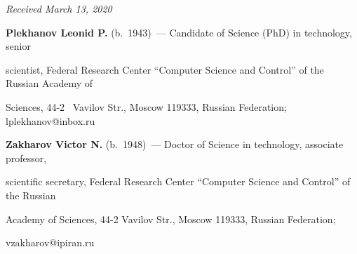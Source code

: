 \vspace*{-6pt}





\hfill{\small\textit{Received March 13, 2020}} 





\vspace*{-12pt} 





\Contrl





\vspace*{-4pt}





\noindent


\textbf{Plekhanov Leonid P.} (b.\ 1943)~--- Candidate of Science (PhD) in technology, senior 


scientist, Federal Research Center ``Computer Science and Control'' of the Russian Academy of 


Sciences, 44-2~ Vavilov Str., Moscow 119333, Russian Federation; \mbox{lplekhanov@inbox.ru}





\vspace*{3pt}





 


\noindent


\textbf{Zakharov Victor N.} (b.\ 1948)~--- Doctor of Science in technology, associate professor, 


scientific secretary, Federal Research Center ``Computer Science and Control'' of the Russian 


Academy of Sciences, 44-2 Vavilov Str., Moscow 119333, Russian Federation; 


\mbox{vzakharov@ipiran.ru}





\label{end\stat}





\renewcommand{\bibname}{\protect\rm Литература} 


